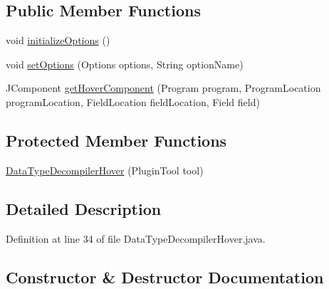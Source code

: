 \subsection*{Public Member Functions}
\begin{DoxyCompactItemize}
\item 
void \mbox{\hyperlink{classghidra_1_1app_1_1decompiler_1_1component_1_1hover_1_1_data_type_decompiler_hover_a5f9be3b0b5c121c89e5a5f542b79e2a9}{initialize\+Options}} ()
\item 
void \mbox{\hyperlink{classghidra_1_1app_1_1decompiler_1_1component_1_1hover_1_1_data_type_decompiler_hover_aa8cbe977599823b60fde35a7a62c7151}{set\+Options}} (Options options, String option\+Name)
\item 
J\+Component \mbox{\hyperlink{classghidra_1_1app_1_1decompiler_1_1component_1_1hover_1_1_data_type_decompiler_hover_a3f2f0f4aa1bc579e44d53e48dffad78b}{get\+Hover\+Component}} (Program program, Program\+Location program\+Location, Field\+Location field\+Location, Field field)
\end{DoxyCompactItemize}
\subsection*{Protected Member Functions}
\begin{DoxyCompactItemize}
\item 
\mbox{\hyperlink{classghidra_1_1app_1_1decompiler_1_1component_1_1hover_1_1_data_type_decompiler_hover_ad0f0abf0f25b3fb58f6c057c0e5bc37e}{Data\+Type\+Decompiler\+Hover}} (Plugin\+Tool tool)
\end{DoxyCompactItemize}


\subsection{Detailed Description}


Definition at line 34 of file Data\+Type\+Decompiler\+Hover.\+java.



\subsection{Constructor \& Destructor Documentation}
\mbox{\label{classghidra_1_1app_1_1decompiler_1_1component_1_1hover_1_1_data_type_decompiler_hover_ad0f0abf0f25b3fb58f6c057c0e5bc37e}} 
